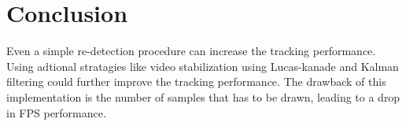 \documentclass[9pt]{IEEEtran}
\begin{document}
\section{Conclusion}
Even a simple re-detection procedure can increase the tracking performance.
Using adtional stratagies like video stabilization using Lucas-kanade and Kalman filtering could further improve the tracking performance.
The drawback of this implementation is the number of samples that has to be drawn, leading to a drop in FPS performance.




\end{document}
